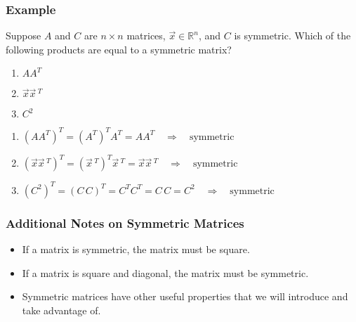 \begin{frame} \frametitle{Example}

    Suppose $A$ and $C$ are $n \times n$ matrices, $\vec x \in \mathbb R^n$, and $C$ is symmetric. Which of the following products are equal to a symmetric matrix? 
    
    \begin{enumerate}
        \item<2-> $AA^T$
        \item<2-> $\vec x \vec x \, ^T$
        \item<2-> $C^2$
    \end{enumerate}
    
    
    \begin{enumerate}
        \item<3-> $(AA^T)^T =  (A^{T})^T A^T = AA^T \quad \Rightarrow \quad \text{symmetric} $
        \item<4-> $(\vec x \vec x \, ^T )^T = (\vec x \, ^T)^T \vec x \, ^T = \vec x \vec x \, ^T \quad \Rightarrow \quad \text{symmetric} $
        \item<5-> $(C^2)^T = (C\,C)^T = C^T C^T = C\,C = C^2 \quad \Rightarrow \quad \text{symmetric}$
    \end{enumerate}
    
\end{frame}






\begin{frame} \frametitle{Additional Notes on Symmetric Matrices}    

\begin{itemize}
    \item<1-> If a matrix is symmetric, the matrix must be square. 
    \item<2-> If a matrix is square and diagonal, the matrix must be symmetric. 
    \item<3-> Symmetric matrices have other useful properties that we will introduce and take advantage of.
\end{itemize}
\end{frame}









